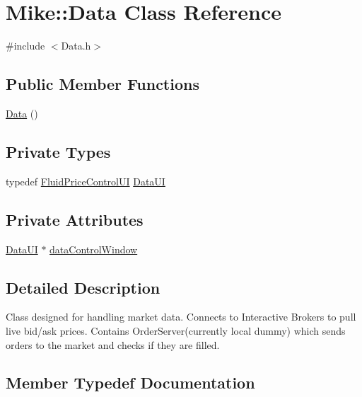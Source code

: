 \hypertarget{class_mike_1_1_data}{}\section{Mike\+:\+:Data Class Reference}
\label{class_mike_1_1_data}


{\ttfamily \#include $<$Data.\+h$>$}

\subsection*{Public Member Functions}
\begin{DoxyCompactItemize}
\item 
\hyperlink{class_mike_1_1_data_afb88d046472d9a49f9ea16d6773d9def}{Data} ()
\end{DoxyCompactItemize}
\subsection*{Private Types}
\begin{DoxyCompactItemize}
\item 
typedef \hyperlink{class_fluid_price_control_u_i}{Fluid\+Price\+Control\+UI} \hyperlink{class_mike_1_1_data_a7d4ea849326ce9098b521ebc12317b58}{Data\+UI}
\end{DoxyCompactItemize}
\subsection*{Private Attributes}
\begin{DoxyCompactItemize}
\item 
\hyperlink{class_mike_1_1_data_a7d4ea849326ce9098b521ebc12317b58}{Data\+UI} $\ast$ \hyperlink{class_mike_1_1_data_a615c7c93b1c7addbe8e888ddbed837a4}{data\+Control\+Window}
\end{DoxyCompactItemize}


\subsection{Detailed Description}
Class designed for handling market data. Connects to Interactive Brokers to pull live bid/ask prices. Contains Order\+Server(currently local dummy) which sends orders to the market and checks if they are filled. 

\subsection{Member Typedef Documentation}
\mbox{\label{class_mike_1_1_data_a7d4ea849326ce9098b521ebc12317b58}} 
